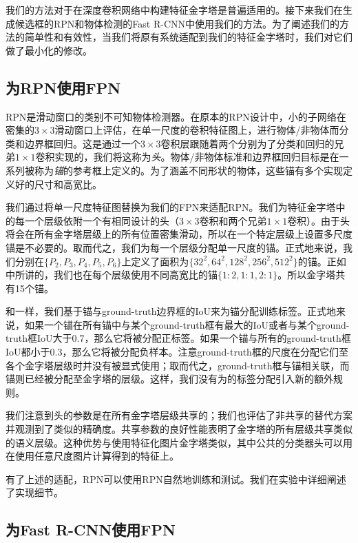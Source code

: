 \documentclass[../main.tex]{subfile}
\begin{document}
我们的方法对于在深度卷积网络中构建特征金字塔是普遍适用的。接下来我们在生成候选框的RPN\cite{rpn}和物体检测的Fast R-CNN\cite{fastrcnn}中使用我们的方法。为了阐述我们的方法的简单性和有效性，当我们将原有系统适配到我们的特征金字塔时，我们对它们做了最小化的修改。

\subsection{为RPN使用FPN}

RPN\cite{rpn}是滑动窗口的类别不可知物体检测器。在原本的RPN设计中，小的子网络在密集的$3\times 3$滑动窗口上评估，在单一尺度的卷积特征图上，进行物体/非物体而分类和边界框回归。这是通过一个$3\times 3$卷积层跟随着两个分别为了分类和回归的兄弟$1\times 1$卷积实现的，我们将这称为\textit{头}。物体/非物体标准和边界框回归目标是在一系列被称为\textit{锚}\cite{fpn}的参考框上定义的。为了涵盖不同形状的物体，这些锚有多个实现定义好的尺寸和高宽比。

我们通过将单一尺度特征图替换为我们的FPN来适配RPN。我们为特征金字塔中的每一个层级依附一个有相同设计的头（$3\times 3$卷积和两个兄弟$1\times 1$卷积）。由于头将会在所有金字塔层级上的所有位置密集滑动，所以在一个特定层级上设置多尺度锚是不必要的。取而代之，我们为每一个层级分配单一尺度的锚。正式地来说，我们分别在$\{P_2, P_3,P_4,P_5, P_6\}$上定义了面积为$\{32^2,64^2,128^2,256^2,512^2\}$的锚。正如\cite{rpn}中所讲的，我们也在每个层级使用不同高宽比的锚$\{1:2, 1:1, 2:1\}$。所以金字塔共有15个锚。

和\cite{rpn}一样，我们基于锚与ground-truth边界框的IoU来为锚分配训练标签。正式地来说，如果一个锚在所有锚中与某个ground-truth框有最大的IoU或者与某个ground-truth框IoU大于0.7，那么它将被分配正标签。如果一个锚与所有的ground-truth框IoU都小于0.3，那么它将被分配负样本。注意ground-truth框的尺度在分配它们至各个金字塔层级时并没有被显式使用；取而代之，ground-truth框与锚相关联，而锚则已经被分配至金字塔的层级。这样，我们没有为\cite{rpn}的标签分配引入新的额外规则。

我们注意到头的参数是在所有金字塔层级共享的；我们也评估了非共享的替代方案并观测到了类似的精确度。共享参数的良好性能表明了金字塔的所有层级共享类似的语义层级。这种优势与使用特征化图片金字塔类似，其中公共的分类器头可以用在使用任意尺度图片计算得到的特征上。

有了上述的适配，RPN可以使用RPN自然地训练和测试。我们在实验中详细阐述了实现细节。

\subsection{为Fast R-CNN使用FPN}
\end{document}
